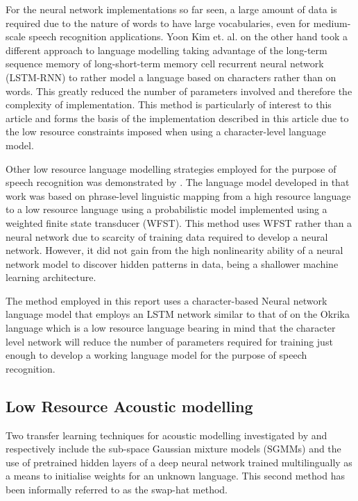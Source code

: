 For the neural network implementations so far seen, a large amount of data is required due to the nature of words to have large vocabularies, even for medium-scale speech recognition applications.  Yoon Kim et. al. \cite{kim2016character} on the other hand took a different approach to language modelling taking advantage of the long-term sequence memory of long-short-term memory cell recurrent neural network (LSTM-RNN) to rather model a language based on characters rather than on words.  This greatly reduced the number of parameters involved and therefore the complexity of implementation.  This method is particularly of interest to this article and forms the basis of the implementation described in this article due to the low resource constraints imposed when using a character-level language model.

Other low resource language modelling strategies employed for the purpose of speech recognition was demonstrated by \cite{xu2013cross}.  The language model developed in that work was based on phrase-level linguistic mapping from a high resource language to a low resource language using a probabilistic model implemented using a weighted finite state transducer (WFST). This method uses WFST rather than a neural network due to scarcity of training data required to develop a neural network. However, it did not gain from the high nonlinearity ability of a neural network model to discover hidden patterns in data, being a shallower machine learning architecture.

The method employed in this report uses a character-based Neural network language model that employs an LSTM network similar to that of \cite{kim2016character} on the Okrika language which is a low resource language bearing in mind that the character level network will reduce the number of parameters required for training just enough to develop a working language model for the purpose of speech recognition.  

\subsection{Low Resource Acoustic modelling}

Two transfer learning techniques for acoustic modelling investigated by \cite{povey2011subspace} and \cite{ghoshal2013multilingual} respectively include the sub-space Gaussian mixture models (SGMMs) and the use of pretrained hidden layers of a deep neural network trained multilingually as a means to initialise weights for an unknown language.  This second method has been informally referred to as the swap-hat method.

